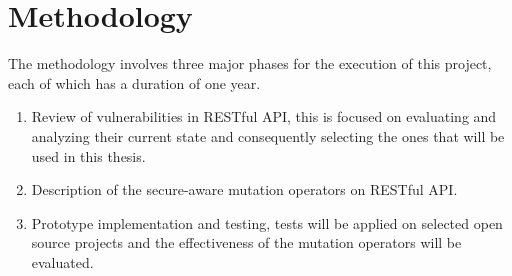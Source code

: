 \chapter{Methodology}

The methodology involves three major phases for the execution of this project, each of which has a duration of one year.

\begin{enumerate}
    \item Review of vulnerabilities in RESTful API, this is focused on evaluating and analyzing their current state and consequently selecting the ones that will be used in this thesis.
    \item Description of the secure-aware mutation operators on RESTful API.
    \item Prototype implementation and testing, tests will be applied on selected open source projects and the effectiveness of the mutation operators will be evaluated.
\end{enumerate}